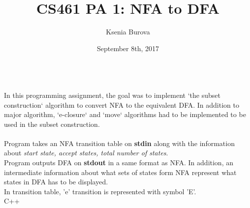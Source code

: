 \documentclass[12pt, letterpaper]{article}
\title{CS461 PA 1: NFA to DFA }
\author{Ksenia Burova}
\date{September 8th, 2017}
\begin{document}
 
\maketitle

\\
In this programming assignment, the goal was to implement `the subset construction` algorithm to convert NFA to the equivalent DFA. In addition to major algorithm, `e-closure` and `move` algorithms had to be implemented to be used in the subset construction. \\


\\
Program takes an NFA transition table on {\bf stdin} along with the information about {\it start state, accept states, total number of states}.\\
Program outputs DFA on {\bf stdout} in a same format as NFA. In addition, an intermediate information about what sets of states form NFA represent what states in DFA has to be displayed. \\
In transition table, 'e' transition is represented with symbol 'E'.\\

 C++\\
\end{document}
